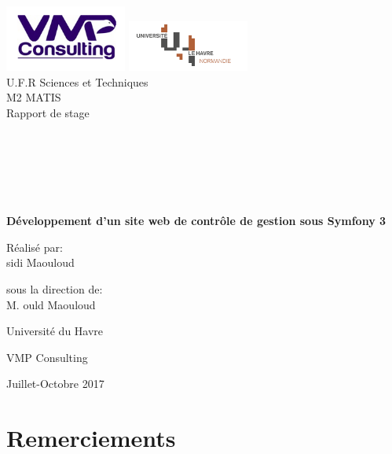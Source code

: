 \documentclass[12pt]{article}
\begin{document}
\begin{titlepage}
\begin{center}

\hfill
\vfill
\bigskip
\huge{ \includegraphics[width=0.3\textwidth]{logo.png} 
\includegraphics[width=0.3\textwidth]{lh.png} \\
U.F.R Sciences et Techniques \\
M2 MATIS  \\
 Rapport de stage \\  \\ \\ \\ \\
 } 
\vfill
\bigskip 
\Huge 
\bigskip %
\\ \\
\textbf{ Développement d'un site web de contrôle de gestion sous Symfony 3 } \par 
\vfill

\Large \begin{flushleft}
 Réalisé par:\\ sidi Maouloud \par
\end{flushleft}
		 
		  \begin{flushright}
		                    sous la direction de:\\  M. ould Maouloud
		                   \end{flushright}



		 
\vfill
\Large Université du Havre \par \Large VMP Consulting		
		\bigskip 
\bigskip

\Large
Juillet-Octobre 2017
\end{center}
\end{titlepage}

\section*{Remerciements}
\end{document}
